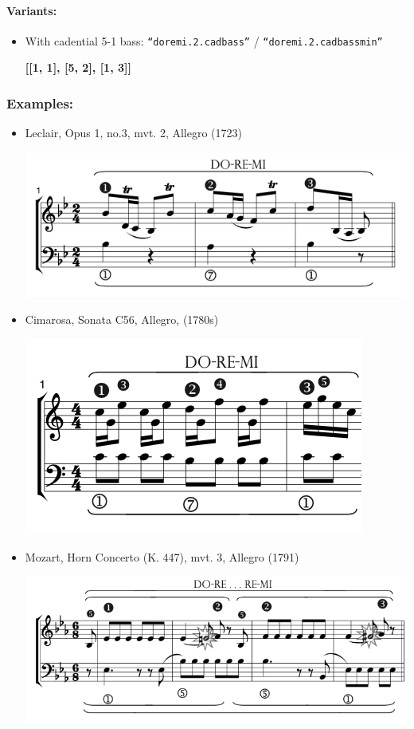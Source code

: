 \documentclass[11pt, openany]{article}
\begin{document}
\paragraph{Variants:}
\begin{itemize}
\item With cadential 5-1 bass:  \texttt{“doremi.2.cadbass”} / \texttt{“doremi.2.cadbassmin”}
	\begin{center}
    \textbf{[[1, 1], [5, 2], [1, 3]]}
    \end{center}
\end{itemize}

\subsubsection{Examples:}
\begin{itemize}
\item Leclair, Opus 1, no.3, mvt. 2, Allegro (1723)
\begin{center}
\includegraphics[scale=0.5]{leclair1.png}
\end{center}
\item Cimarosa, Sonata C56, Allegro, (1780s)
\begin{center}
\includegraphics[scale=0.5]{cimarosa56.png}
\end{center}
\item Mozart, Horn Concerto (K. 447), mvt. 3, Allegro (1791)
\begin{center}
\includegraphics[scale=0.5]{mozart447.png}
\end{center}
\end{itemize}
\end{document}
